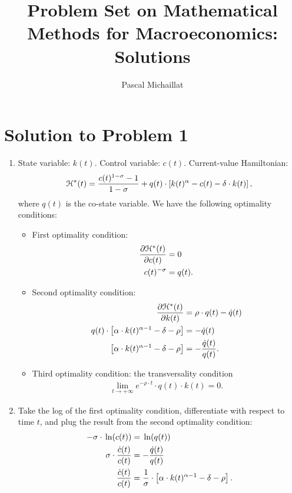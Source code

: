 \documentclass[letterpaper,12pt,leqno]{article}
\begin{document}
\title{Problem Set on Mathematical Methods for Macroeconomics: Solutions}
\author{Pascal Michaillat}
\date{}

\begin{titlepage}
\maketitle
\end{titlepage}


\section*{Solution to Problem 1}

\begin{enumerate}
\item State variable: $k(t)$. Control variable: $c(t)$. Current-value Hamiltonian:
\[\mathcal{H}^{*}(t)=\frac{c(t)^{1-\sigma}-1}{1-\sigma} +q(t)\cdot \left[k(t)^{\alpha}-c(t)-\delta \cdot k(t)\right],\]
where $q(t)$ is the co-state variable. We have the following optimality conditions:

\begin{itemize}

\item First optimality condition:
\begin{align*}
\frac{\partial \mathcal{H}^{*}(t)}{\partial c(t)}&=0\\
c(t)^{-\sigma}&=q(t).
\end{align*}

\item Second optimality condition:
\begin{align*}
\frac{\partial \mathcal{H}^{*}(t)}{\partial k(t)}&=\rho\cdot q(t)-\dot{q}(t)\\
q(t)\cdot \left[\alpha\cdot k(t)^{\alpha-1}-\delta -\rho\right]&=-\dot{q}(t)\\
\left[ \alpha\cdot k(t)^{\alpha-1}-\delta -\rho \right]&=-\frac{\dot{q}(t)}{q(t)}.\\
\end{align*}

\item Third optimality condition: the transversality condition
\begin{align*}
\lim_{t\to +\infty} e^{-\rho\cdot t}\cdot q(t)\cdot k(t)=0.
\end{align*}

\end{itemize}

\item Take the log of the first optimality condition, differentiate with respect to time $t$, and plug the result from the second optimality condition:
\begin{align*}
-\s\cdot \ln{c(t)}&=\ln{q(t)}\\
\s\cdot \frac{\dot{c}(t)}{c(t)}&=-\frac{\dot{q}(t)}{q(t)}\\
\frac{\dot{c}(t)}{c(t)}&=\frac{1}{\s}\cdot \left[\a\cdot k(t)^{\a-1}-\d -\rho\right].
\end{align*}


\end{enumerate}
\end{document}
